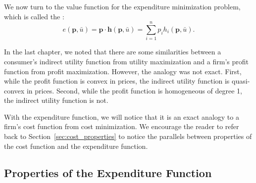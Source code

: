 We now turn to the value function for the expenditure minimization problem, which is called the :
$$e(\mathbf{p}, \bar{u})=\mathbf{p} \cdot \mathbf{h}(\mathbf{p}, \bar{u})=\sum_{i=1}^{n} p_{i} h_{i}(\mathbf{p}, \bar{u}).$$

In the last chapter, we noted that there are some similarities between a consumer's indirect utility function from utility maximization and a firm's profit function from profit maximization. However, the analogy was not exact. First, while the profit function is convex in prices, the indirect utility function is quasi-convex in prices. Second, while the profit function is homogeneous of degree 1, the indirect utility function is not.

With the expenditure function, we will notice that it is an exact analogy to a firm's cost function from cost minimization. We encourage the reader to refer back to Section~\ref{sec:cost_properties} to notice the parallels between properties of the cost function and the expenditure function.

\subsection*{Properties of the Expenditure Function}

